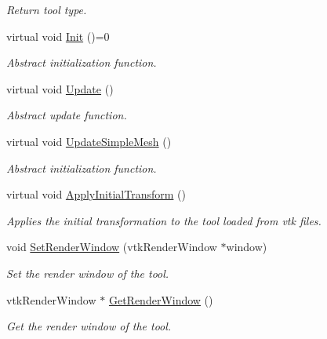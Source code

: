 \begin{DoxyCompactItemize}
\begin{DoxyCompactList}\small\item\em Return tool type. \item\end{DoxyCompactList}\item 
virtual void \hyperlink{classvtkTool_a6b9e7743cde1b61b252abef17248a913}{Init} ()=0
\begin{DoxyCompactList}\small\item\em Abstract initialization function. \item\end{DoxyCompactList}\item 
virtual void \hyperlink{classvtkTool_a0f1b6e049d7ff5420f4f4604434a9da7}{Update} ()
\begin{DoxyCompactList}\small\item\em Abstract update function. \item\end{DoxyCompactList}\item 
virtual void \hyperlink{classvtkTool_ac44896d171f0512b821f7ab031f7fed7}{UpdateSimpleMesh} ()
\begin{DoxyCompactList}\small\item\em Abstract initialization function. \item\end{DoxyCompactList}\item 
virtual void \hyperlink{classvtkTool_af5802e4ba0d2c217bef741ce55ee2b0e}{ApplyInitialTransform} ()
\begin{DoxyCompactList}\small\item\em Applies the initial transformation to the tool loaded from vtk files. \item\end{DoxyCompactList}\item 
void \hyperlink{classvtkTool_a8f036524a724871dd5f7317e3000611c}{SetRenderWindow} (vtkRenderWindow $\ast$window)
\begin{DoxyCompactList}\small\item\em Set the render window of the tool. \item\end{DoxyCompactList}\item 
vtkRenderWindow $\ast$ \hyperlink{classvtkTool_ab156b5e1d4a9974b6b4a9809fdb10dc1}{GetRenderWindow} ()
\begin{DoxyCompactList}\small\item\em Get the render window of the tool. \item\end{DoxyCompactList}\item 

\end{DoxyCompactItemize}
